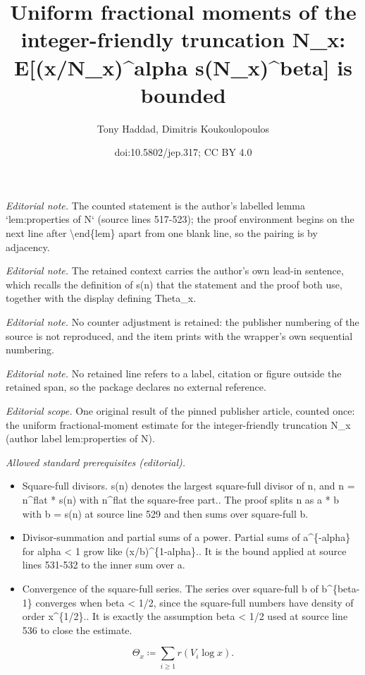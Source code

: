 \documentclass[10pt,a4paper]{article}
\title{Uniform fractional moments of the integer-friendly truncation N\_x: E[(x/N\_x)\textasciicircum{}alpha s(N\_x)\textasciicircum{}beta] is bounded}
\author{Tony Haddad, Dimitris Koukoulopoulos}
\date{doi:10.5802/jep.317; CC BY 4.0}
\theoremstyle{plain}
\theoremstyle{definition}
\begin{document}
\maketitle
\noindent\textit{Editorial note.} The counted statement is the author's labelled lemma `lem:properties of N` (source lines 517-523); the proof environment begins on the next line after \textbackslash{}end\{lem\} apart from one blank line, so the pairing is by adjacency.\par\medskip
\noindent\textit{Editorial note.} The retained context carries the author's own lead-in sentence, which recalls the definition of s(n) that the statement and the proof both use, together with the display defining Theta\_x.\par\medskip
\noindent\textit{Editorial note.} No counter adjustment is retained: the publisher numbering of the source is not reproduced, and the item prints with the wrapper's own sequential numbering.\par\medskip
\noindent\textit{Editorial note.} No retained line refers to a label, citation or figure outside the retained span, so the package declares no external reference.\par\medskip
\noindent\textit{Editorial scope.} One original result of the pinned publisher article, counted once: the uniform fractional-moment estimate for the integer-friendly truncation N\_x (author label lem:properties of N).\par\medskip
\noindent\textit{Allowed standard prerequisites (editorial).}\begin{itemize}
\item Square-full divisors. s(n) denotes the largest square-full divisor of n, and n = n\textasciicircum{}flat * s(n) with n\textasciicircum{}flat the square-free part.. The proof splits n as a * b with b = s(n) at source line 529 and then sums over square-full b.
\item Divisor-summation and partial sums of a power. Partial sums of a\textasciicircum{}\{-alpha\} for alpha < 1 grow like (x/b)\textasciicircum{}\{1-alpha\}.. It is the bound applied at source lines 531-532 to the inner sum over a.
\item Convergence of the square-full series. The series over square-full b of b\textasciicircum{}\{beta-1\} converges when beta < 1/2, since the square-full numbers have density of order x\textasciicircum{}\{1/2\}.. It is exactly the assumption beta < 1/2 used at source line 536 to close the estimate.
\end{itemize}\medskip
\begin{equation}
\label{eq:def of Theta_x}
\Theta_x \coloneqq \sum_{i \ge 1} r(V_i\log x).
\end{equation}
\end{document}

